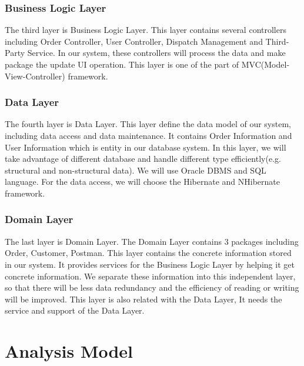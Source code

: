 \documentclass[12pt]{scrreprt}
\begin{document}
\subsubsection{Business Logic Layer}
The third layer is Business Logic Layer. This layer contains several controllers including Order Controller, User Controller, Dispatch Management and Third-Party Service. In our system, these controllers will process the data and make package the update UI operation. This layer is one of the part of MVC(Model-View-Controller) framework.
\subsubsection{Data Layer}
The fourth layer is Data Layer. This layer define the data model of our system, including data access and data maintenance. It contains Order Information and User Information which is entity in our database system. In this layer, we will take advantage of different database and handle different type efficiently(e.g. structural and non-structural data). We will use Oracle DBMS and SQL language. For the data access, we will choose the Hibernate and NHibernate framework.
\subsubsection{Domain Layer}
The last layer is Domain Layer. The Domain Layer contains $3$ packages including Order, Customer, Postman. This layer contains the concrete information stored in our system. It provides services for the Business Logic Layer by helping it get concrete information. We separate these information into this independent layer, so that there will be less data redundancy and the efficiency of reading or writing will be improved. This layer is also related with the Data Layer, It needs the service and support of the Data Layer.

\section{Analysis Model}
\end{document}
